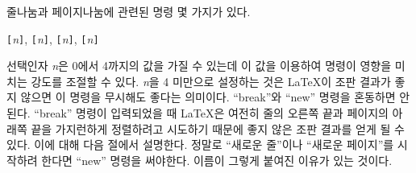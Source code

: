 줄나눔과 페이지나눔에 관련된 명령 몇 가지가 있다.
\begin{lscommand}
\verb|[|\emph{n}\verb|]|,
\verb|[|\emph{n}\verb|]|,
\verb|[|\emph{n}\verb|]|,
\verb|[|\emph{n}\verb|]|
\end{lscommand}
\noindent 선택인자 \emph{n}은 0에서 4까지의 값을 가질 수 있는데 이 값을 이용하여 명령이 영향을 미치는 강도를 조절할 수 있다.
\emph{n}을 4 미만으로 설정하는 것은 \LaTeX 이 조판 결과가 좋지 않으면 이 명령을 무시해도 좋다는 의미이다.
``break''와 ``new'' 명령을 혼동하면 안된다. ``break'' 명령이 입력되었을 때 \LaTeX 은 여전히 줄의 오른쪽 끝과 페이지의 아래쪽 끝을
가지런하게 정렬하려고 시도하기 때문에 좋지 않은 조판 결과를 얻게 될 수 있다. 이에 대해 다음 절에서 설명한다.
정말로 ``새로운 줄''이나 ``새로운 페이지''를 시작하려 한다면 ``new'' 명령을 써야한다. 이름이 그렇게 붙여진 이유가 있는 것이다.

